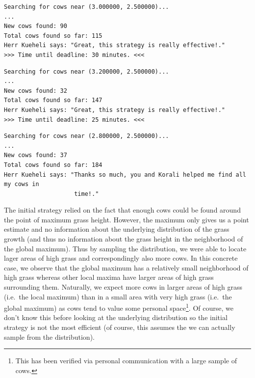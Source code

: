 \documentclass{article}
\begin{document}
    \begin{lstlisting}[basicstyle=\tiny, frame=single,
    caption={Terminal output for $check\_cows$ for the coordinates of the
    (local) maximum observed in Figure~\ref{fig:GrassHeight}.},
    label={lst:CowsOpt}]
Searching for cows near (3.000000, 2.500000)...
...
New cows found: 90
Total cows found so far: 115
Herr Kueheli says: "Great, this strategy is really effective!."
>>> Time until deadline: 30 minutes. <<<
    \end{lstlisting}
    \begin{lstlisting}[basicstyle=\tiny, frame=single,
    caption={Terminal output for $check\_cows$ for a point in the
    neighborhood of the (local) maximum observed in
    Figure~\ref{fig:GrassHeight}.}, label={lst:CowsOptRight}]
Searching for cows near (3.200000, 2.500000)...
...
New cows found: 32
Total cows found so far: 147
Herr Kueheli says: "Great, this strategy is really effective!."
>>> Time until deadline: 25 minutes. <<<
    \end{lstlisting}
    \begin{lstlisting}[basicstyle=\tiny, frame=single,
    caption={Terminal output for $check\_cows$ for a point in the
    neighborhood of the (local) maximum observed in
    Figure~\ref{fig:GrassHeight}.}, label={lst:CowsOptLeft}]
Searching for cows near (2.800000, 2.500000)...
...
New cows found: 37
Total cows found so far: 184
Herr Kueheli says: "Thanks so much, you and Korali helped me find all my cows in
                    time!."
    \end{lstlisting}

    The initial strategy relied on the fact that enough cows could be found
    around the point of maximum grass height.
    However, the maximum only gives us a point estimate and no information
    about the underlying distribution of the grass growth (and thus no
    information about the grass height in the neighborhood of the global
    maximum).
    Thus by sampling the distribution, we were able to locate lager areas
    of high grass and correspondingly also more cows.
    In this concrete case, we observe that the global maximum has a
    relatively small neighborhood of high grass whereas other local maxima
    have larger areas of high grass surrounding them.
    Naturally, we expect more cows in larger areas of high grass (i.e.\ the
    local maximum) than in a small area with very high grass (i.e.\ the
    global maximum) as cows tend to value some personal space\footnote{This
    has been verified via personal communication with a large sample of cows.}.
    Of course, we don't know this before looking at the underlying distribution
    so the initial strategy is not the most efficient (of course, this
    assumes the we can actually sample from the distribution).
\end{document}
